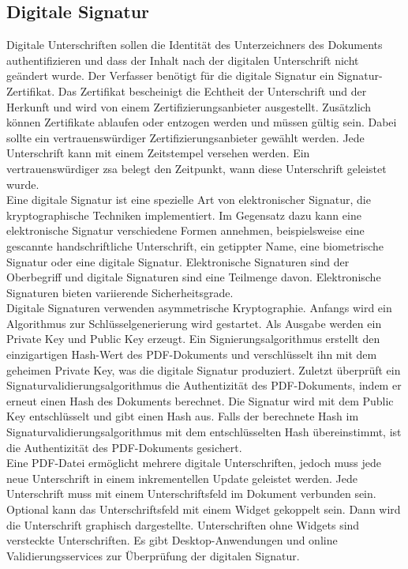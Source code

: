 \subsection{Digitale Signatur}
Digitale Unterschriften sollen die Identität des Unterzeichners des Dokuments authentifizieren und dass der Inhalt nach der digitalen Unterschrift nicht geändert wurde. Der Verfasser benötigt für die digitale Signatur ein Signatur-Zertifikat. Das Zertifikat bescheinigt die Echtheit der Unterschrift und der Herkunft und wird von einem Zertifizierungsanbieter ausgestellt. Zusätzlich können Zertifikate ablaufen oder entzogen werden und müssen gültig sein. Dabei sollte ein vertrauenswürdiger Zertifizierungsanbieter gewählt werden. Jede Unterschrift kann mit einem Zeitstempel versehen werden. Ein vertrauenswürdiger \gls{zsa} belegt den Zeitpunkt, wann diese Unterschrift geleistet wurde. \cite{softx} \\
Eine digitale Signatur ist eine spezielle Art von elektronischer Signatur, die kryptographische Techniken implementiert. Im Gegensatz dazu kann eine elektronische Signatur verschiedene Formen annehmen, beispielsweise eine gescannte handschriftliche Unterschrift, ein getippter Name, eine biometrische Signatur oder eine digitale Signatur. Elektronische Signaturen sind der Oberbegriff und digitale Signaturen sind eine Teilmenge davon. Elektronische Signaturen bieten variierende Sicherheitsgrade. \cite{adobe-pdf-pades} \\
Digitale Signaturen verwenden asymmetrische Kryptographie. Anfangs wird ein Algorithmus zur Schlüsselgenerierung wird gestartet. Als Ausgabe werden ein Private Key und Public Key erzeugt. Ein Signierungsalgorithmus erstellt den einzigartigen Hash-Wert des PDF-Dokuments und verschlüsselt ihn mit dem geheimen Private Key, was die digitale Signatur produziert. Zuletzt überprüft ein Signaturvalidierungsalgorithmus die Authentizität des PDF-Dokuments, indem er erneut einen Hash des Dokuments berechnet. Die Signatur wird mit dem Public Key entschlüsselt und gibt einen Hash aus. Falls der berechnete Hash im Signaturvalidierungsalgorithmus mit dem entschlüsselten Hash übereinstimmt, ist die Authentizität des PDF-Dokuments gesichert. \cite{signature} \\
Eine PDF-Datei ermöglicht mehrere digitale Unterschriften, jedoch muss jede neue Unterschrift in einem inkrementellen Update geleistet werden. Jede Unterschrift muss mit einem Unterschriftsfeld im Dokument verbunden sein. Optional kann das Unterschriftsfeld mit einem Widget gekoppelt sein. Dann wird die Unterschrift graphisch dargestellte. Unterschriften ohne Widgets sind versteckte Unterschriften. \cite{softx} Es gibt Desktop-Anwendungen und online Validierungsservices zur Überprüfung der digitalen Signatur.


